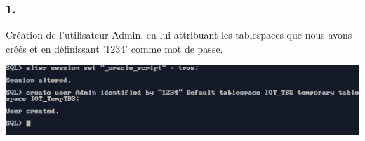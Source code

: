 \subsubsection*{1.}

Création de l'utilisateur Admin, en lui attribuant les tablespaces que nous avons créés et en définissant '1234' comme mot de passe.



\begin{center}
    \includegraphics[width=\textwidth]{ScreenShot/Partie4/admin.png}
\end{center}

